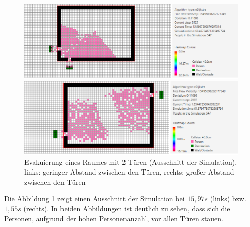 \begin{figure}[!htb]
	\centering
	\begin{minipage}{.5\textwidth}
		\centering
		\includegraphics[width=\textwidth]{abbildungen/Evak2TMinDis2MITTE.PNG}
	\end{minipage}%
	\begin{minipage}{0.5\textwidth}
		\centering
		\includegraphics[width=\textwidth]{abbildungen/Evak2TMaxDis2MITTE.PNG}
	\end{minipage}
	\caption{Evakuierung eines Raumes mit 2 Türen (Ausschnitt der Simulation), links: geringer Abstand zwischen den Türen, rechts: großer Abstand zwischen den Türen}
	\label{fig:Evak2TminmaxDis2MITE}
\end{figure}

Die Abbildung \ref{fig:Evak2TminmaxDis2MITE} zeigt einen Ausschnitt der Simulation bei $15,97s$ (links) bzw. $1,55s$ (rechts). In beiden Abbildungen ist deutlich zu sehen, dass sich die Personen, aufgrund der hohen Personenanzahl, vor allen Türen stauen.

